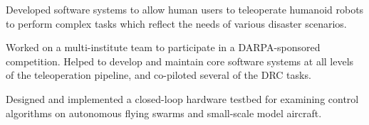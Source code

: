 \documentclass[10pt,a4paper,ragged2e]{altacv}
\begin{document}
\divider

Developed software systems to allow human users to teleoperate humanoid robots to perform complex tasks which reflect the needs of various disaster scenarios.

\divider

Worked on a multi-institute team to participate in a DARPA-sponsored competition. Helped to develop and maintain core software systems at all levels of the teleoperation pipeline, and co-piloted several of the DRC tasks.

\divider

Designed and implemented a closed-loop hardware testbed for examining control algorithms on autonomous flying swarms and small-scale model aircraft.

\clearpage


\nocite{*}

\printbibliography[heading=pubtype,title={\printinfo{\faBook}{Books}},type=book]

\divider

\printbibliography[heading=pubtype,title={\printinfo{\faFileTextO}{Journal Articles}},type=article]

\divider

\printbibliography[heading=pubtype,title={\printinfo{\faGroup}{Conference Proceedings}},type=inproceedings]

\end{document}
